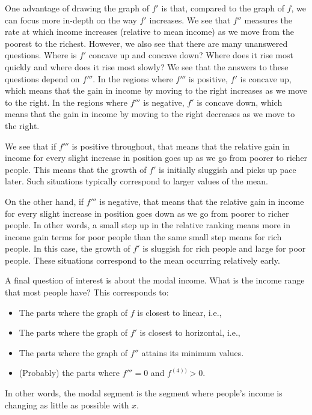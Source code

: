 \documentclass{amsart}
\begin{document}
One advantage of drawing the graph of $f'$ is that, compared to the
graph of $f$, we can focus more in-depth on the way $f'$ increases. We
see that $f''$ measures the rate at which income increases (relative
to mean income) as we move from the poorest to the richest. However,
we also see that there are many unanswered questions. Where is $f'$
concave up and concave down? Where does it rise most quickly and where
does it rise most slowly? We see that the answers to these questions
depend on $f'''$. In the regions where $f'''$ is positive, $f'$ is
concave up, which means that the gain in income by moving to the right
increases as we move to the right. In the regions where $f'''$ is
negative, $f'$ is concave down, which means that the gain in income by
moving to the right decreases as we move to the right.

We see that if $f'''$ is positive throughout, that means that the
relative gain in income for every slight increase in position goes up
as we go from poorer to richer people. This means that the growth of
$f'$ is initially sluggish and picks up pace later. Such situations
typically correspond to larger values of the mean.

On the other hand, if $f'''$ is negative, that means that the relative
gain in income for every slight increase in position goes down as we
go from poorer to richer people. In other words, a small step up in
the relative ranking means more in income gain terms for poor people
than the same small step means for rich people. In this case, the
growth of $f'$ is sluggish for rich people and large for poor
people. These situations correspond to the mean occurring relatively
early.

A final question of interest is about the modal income. What is the
income range that most people have? This corresponds to:

\begin{itemize}
\item The parts where the graph of $f$ is closest to linear, i.e.,
\item The parts where the graph of $f'$ is closest to horizontal, i.e.,
\item The parts where the graph of $f''$ attains its minimum values.
\item (Probably) the parts where $f''' = 0$ and $f^{(4))} > 0$. 
\end{itemize}

In other words, the modal segment is the segment where people's income
is changing as little as possible with $x$.
\end{document}
